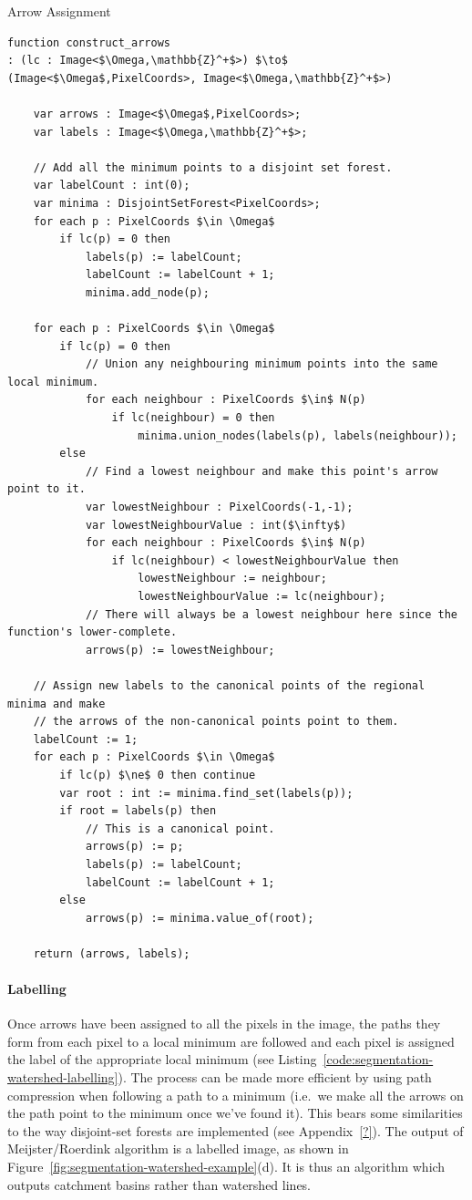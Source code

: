 \begin{stulisting}[p]
\caption{Arrow Assignment}
\label{code:segmentation-watershed-arrowassignment}
\begin{lstlisting}[style=Default]
function construct_arrows
: (lc : Image<$\Omega,\mathbb{Z}^+$>) $\to$ (Image<$\Omega$,PixelCoords>, Image<$\Omega,\mathbb{Z}^+$>)

	var arrows : Image<$\Omega$,PixelCoords>;
	var labels : Image<$\Omega,\mathbb{Z}^+$>;

	// Add all the minimum points to a disjoint set forest.
	var labelCount : int(0);
	var minima : DisjointSetForest<PixelCoords>;
	for each p : PixelCoords $\in \Omega$
		if lc(p) = 0 then
			labels(p) := labelCount;
			labelCount := labelCount + 1;
			minima.add_node(p);

	for each p : PixelCoords $\in \Omega$
		if lc(p) = 0 then
			// Union any neighbouring minimum points into the same local minimum.
			for each neighbour : PixelCoords $\in$ N(p)
				if lc(neighbour) = 0 then
					minima.union_nodes(labels(p), labels(neighbour));
		else
			// Find a lowest neighbour and make this point's arrow point to it.
			var lowestNeighbour : PixelCoords(-1,-1);
			var lowestNeighbourValue : int($\infty$)
			for each neighbour : PixelCoords $\in$ N(p)
				if lc(neighbour) < lowestNeighbourValue then
					lowestNeighbour := neighbour;
					lowestNeighbourValue := lc(neighbour);
			// There will always be a lowest neighbour here since the function's lower-complete.
			arrows(p) := lowestNeighbour;

	// Assign new labels to the canonical points of the regional minima and make
	// the arrows of the non-canonical points point to them.
	labelCount := 1;
	for each p : PixelCoords $\in \Omega$
		if lc(p) $\ne$ 0 then continue
		var root : int := minima.find_set(labels(p));
		if root = labels(p) then
			// This is a canonical point.
			arrows(p) := p;
			labels(p) := labelCount;
			labelCount := labelCount + 1;
		else
			arrows(p) := minima.value_of(root);

	return (arrows, labels);
\end{lstlisting}
\end{stulisting}

\paragraph{Labelling}

Once arrows have been assigned to all the pixels in the image, the paths they form from each pixel to a local minimum are followed and each pixel is assigned the label of the appropriate local minimum (see Listing~\ref{code:segmentation-watershed-labelling}). The process can be made more efficient by using path compression when following a path to a minimum (i.e.~we make all the arrows on the path point to the minimum once we've found it). This bears some similarities to the way disjoint-set forests are implemented (see Appendix~\ref{?}). The output of Meijster/Roerdink algorithm is a labelled image, as shown in Figure~\ref{fig:segmentation-watershed-example}(d). It is thus an algorithm which outputs catchment basins rather than watershed lines.

